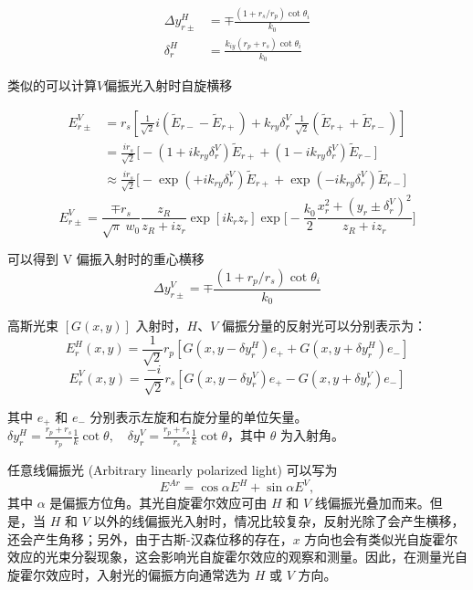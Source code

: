 \documentclass[12pt]{ctexart}
\numberwithin{equation}{section} %
\begin{document}
    \begin{align*}\Delta y_{r\pm}^H&=\mp\frac{(1+r_s/r_p)\cot\theta_i}{k_0}\\\delta_r^H&=\frac{k_{iy}(r_p+r_s)\cot\theta_i}{k_0}\end{align*}

    类似的可以计算$V$偏振光入射时自旋横移

    $$\begin{aligned}E_{r\pm}^{V}&=r_{s}\left[\frac{1}{\sqrt{2}}i(\tilde{E}_{r-}-\tilde{E}_{r+})+k_{ry}\delta_{r}^{V}\:\frac{1}{\sqrt{2}}(\tilde{E}_{r+}+\tilde{E}_{r-})\right]\\&=\frac{ir_{s}}{\sqrt{2}}\biggl[-(1+ik_{ry}\delta_{r}^{V})\tilde{E}_{r+}+(1-ik_{ry}\delta_{r}^{V})\tilde{E}_{r-}\biggr]\\&\approx\frac{ir_{s}}{\sqrt{2}}\biggl[-\exp(+ik_{ry}\delta_{r}^{V})\tilde{E}_{r+}+\exp(-ik_{ry}\delta_{r}^{V})\tilde{E}_{r-}\biggr]\end{aligned}$$
    $$E_{r\pm}^{V}=\frac{\mp r_{s}}{\sqrt{\pi}\:w_{0}}\frac{z_{R}}{z_{R}+iz_{r}}\exp[ik_{r}z_{r}]\exp\biggl[-\frac{k_{0}}{2}\frac{x_{r}^{2}+(y_{r}\pm\delta_{r}^{V})^{2}}{z_{R}+iz_{r}}\biggr]$$
    
    可以得到 V 偏振入射时的重心横移
    $$\Delta y_{r\pm}^V=\mp\frac{(1+r_p/r_s)\cot\theta_i}{k_0}$$

    高斯光束 $[G(x,y)]$ 入射时，$H$、$V$ 偏振分量的反射光可以分别表示为：
    \begin{equation}
        E_{r}^{H}(x,y) = \frac{1}{\sqrt{2}} r_{p} \left[ G\left(x, y - \delta y_{r}^{H}\right)e_{+} + G\left(x, y + \delta y_{r}^{H}\right)e_{-} \right] 
        \label{eq:光自旋霍尔效应公式1}
    \end{equation}
    \begin{equation}
        E_{r}^{V}(x,y) = \frac{-i}{\sqrt{2}} r_{s} \left[ G\left(x, y - \delta y_{r}^{V}\right)e_{+} - G\left(x, y + \delta y_{r}^{V}\right)e_{-} \right] 
        \label{eq:光自旋霍尔效应公式2}
    \end{equation}
    
    其中 $e_{+}$ 和 $e_{-}$ 分别表示左旋和右旋分量的单位矢量。$\delta y_{r}^{H} = \frac{r_{p} + r_{s}}{r_{p}} \frac{1}{k} \cot \theta, \quad \delta y_{r}^{V} = \frac{r_{p} + r_{s}}{r_{s}} \frac{1}{k} \cot \theta$，其中 $\theta$ 为入射角。
    
    任意线偏振光 (Arbitrary linearly polarized light) 可以写为 
    \[
    E^{Ar} = \cos \alpha E^{H} + \sin \alpha E^{V}, 
    \] 
    其中 $\alpha$ 是偏振方位角。其光自旋霍尔效应可由 $H$ 和 $V$ 线偏振光叠加而来。但是，当 $H$ 和 $V$ 以外的线偏振光入射时，情况比较复杂，反射光除了会产生横移，还会产生角移；另外，由于古斯-汉森位移的存在，$x$ 方向也会有类似光自旋霍尔效应的光束分裂现象，这会影响光自旋霍尔效应的观察和测量。因此，在测量光自旋霍尔效应时，入射光的偏振方向通常选为 $H$ 或 $V$ 方向。
    
\end{document}
